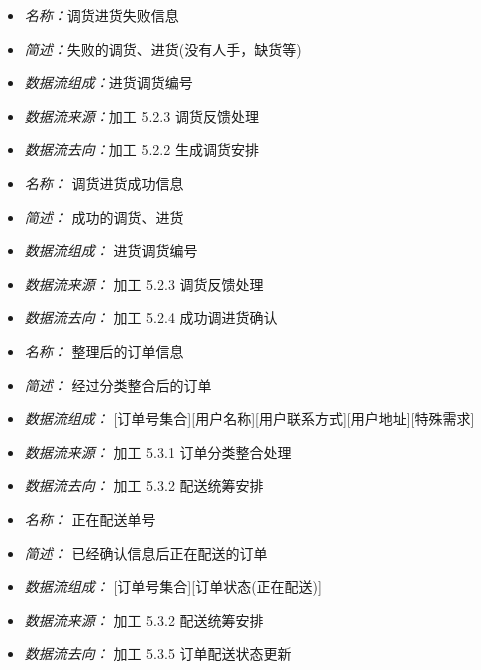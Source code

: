 \vspace{-1mm}

\begin{itemize}
\item \textit{名称：}调货进货失败信息
	\item \textit{简述：}失败的调货、进货(没有人手，缺货等)
	\item \textit{数据流组成：}进货调货编号
	\item \textit{数据流来源：}加工 5.2.3 调货反馈处理
	\item \textit{数据流去向：}加工 5.2.2 生成调货安排
\end{itemize}

\vspace{-1mm}

\begin{itemize}
\item \textit{名称： }调货进货成功信息 
\item \textit{简述： }成功的调货、进货 
\item \textit{数据流组成： }进货调货编号 
\item \textit{数据流来源： }加工 5.2.3 调货反馈处理 
\item \textit{数据流去向： }加工 5.2.4 成功调进货确认

\end{itemize}


\vspace{-1mm}



\begin{itemize}
\item \textit{名称： }整理后的订单信息
\item \textit{简述： }经过分类整合后的订单 
\item \textit{数据流组成： }[订单号集合][用户名称][用户联系方式][用户地址][特殊需求] 
\item \textit{数据流来源： }加工 5.3.1 订单分类整合处理
\item \textit{数据流去向： }加工 5.3.2 配送统筹安排

\end{itemize}


\vspace{-1mm}


\begin{itemize}
\item \textit{名称： }正在配送单号 
\item \textit{简述： }已经确认信息后正在配送的订单 
\item \textit{数据流组成： }[订单号集合][订单状态(正在配送)] 
\item \textit{数据流来源： }加工 5.3.2 配送统筹安排 
\item \textit{数据流去向： }加工 5.3.5 订单配送状态更新

\end{itemize}



